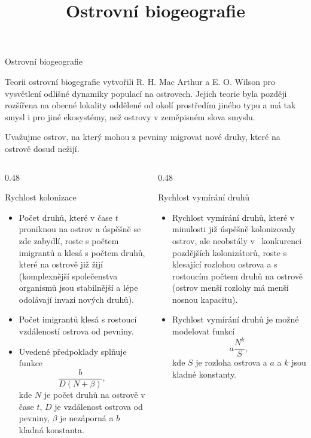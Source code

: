 \documentclass[handouts]{beamer}
\title{Ostrovní biogeografie}
\begin{document}
\begin{frame}

  \begin{center}
    \Large Ostrovní biogeografie 
  \end{center}
  
  Teorii ostrovní biogegrafie vytvořili R. H. Mac Arthur a
  E. O. Wilson pro vysvětlení odlišné dynamiky populací na
  ostrovech. Jejich teorie byla později rozšířena na obecné lokality
  oddělené od okolí prostředím jiného typu a má tak smysl i pro jiné ekosystémy, než ostrovy v zeměpisném slova smyslu.

  \medskip
  Uvažujme ostrov, na který mohou z pevniny migrovat nové druhy, které
  na ostrově dosud nežijí.


  \begin{columns}
    \begin{column}[t]{0.48\hsize}
      \begin{block}{Rychlost kolonizace}
\begin{itemize}
\item Počet druhů, které v čase
$t$ proniknou na ostrov a úspěšně se zde zabydlí, roste s počtem
imigrantů  a klesá s počtem druhů, které na ostrově  již žijí (komplexnější společenstva organismů jsou stabilnější a lépe
odolávají invazi nových druhů).
\item  Počet imigrantů klesá s rostoucí
vzdáleností ostrova od pevniny.
\item  Uvedené předpoklady splňuje funkce
$$
 \frac b{D(N+\beta)},
$$
kde $N$ je počet druhů na ostrově v čase $t$, $D$ je vzdálenost ostrova od
pevniny, $\beta$ je nezáporná a  $b$ kladná konstanta. 
\end{itemize}
\end{block}
\end{column}
\begin{column}[t]{0.48\hsize}
  \begin{block}{Rychlost vymírání  druhů}

\begin{itemize}
\item Rychlost vymírání  druhů, které v minulosti již úspěšně
kolonizovaly ostrov, ale neobstály v~ konkurenci pozdějších kolonizátorů,
roste s~ klesající rozlohou ostrova a s rostoucím počtem druhů na
ostrově (ostrov menší rozlohy má menší nosnou
kapacitu).
\item Rychlost vymírání druhů je možné modelovat funkcí
$$
 a\frac {N^k}S,
$$
kde $S$ je rozloha ostrova a $a$ a $k$ jsou kladné konstanty.
\end{itemize}
\end{block}
\end{column}
\end{columns}


\end{frame}
\end{document}
